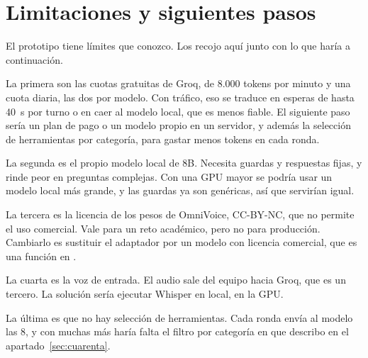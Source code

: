 \section{Limitaciones y siguientes pasos}\label{sec:limitaciones}

El prototipo tiene límites que conozco. Los recojo aquí junto con lo que haría a continuación.

La primera son las cuotas gratuitas de Groq, de 8.000 tokens por minuto y una cuota diaria, las dos por modelo. Con
tráfico, eso se traduce en esperas de hasta 40~s por turno o en caer al modelo local, que es menos fiable. El
siguiente paso sería un plan de pago o un modelo propio en un servidor, y además la selección de herramientas por
categoría, para gastar menos tokens en cada ronda.

La segunda es el propio modelo local de 8B. Necesita guardas y respuestas fijas, y rinde peor en preguntas
complejas. Con una GPU mayor se podría usar un modelo local más grande, y las guardas ya son genéricas, así que
servirían igual.

La tercera es la licencia de los pesos de OmniVoice, CC-BY-NC, que no permite el uso comercial. Vale para un reto
académico, pero no para producción. Cambiarlo es sustituir el adaptador  por un modelo con licencia
comercial, que es una función en .

La cuarta es la voz de entrada. El audio sale del equipo hacia Groq, que es un tercero. La solución sería ejecutar
Whisper en local, en la GPU.

La última es que no hay selección de herramientas. Cada ronda envía al modelo las 8, y con muchas más haría falta el
filtro por categoría en  que describo en el apartado~\ref{sec:cuarenta}.
